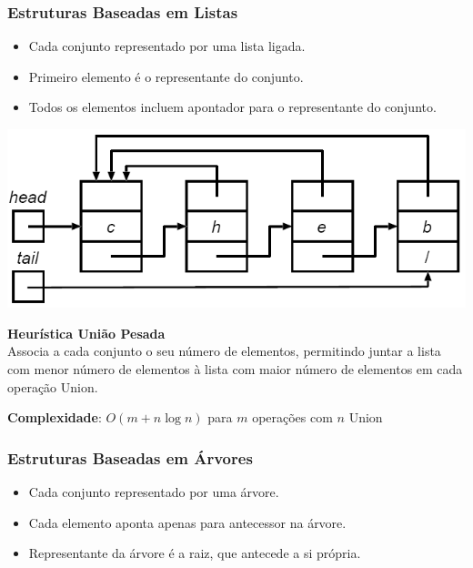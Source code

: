 \documentclass[11pt]{article}
\begin{document}
\subsubsection{Estruturas Baseadas em Listas}

\begin{minipage}{0.55\textwidth}
    \begin{itemize}[topsep=0pt]
        \item Cada conjunto representado por uma lista ligada.
        \item Primeiro elemento é o representante do conjunto.
        \item Todos os elementos incluem apontador para o representante do conjunto.
    \end{itemize}
\end{minipage}
\begin{minipage}{0.44\textwidth}
    \includegraphics[scale=0.4,right]{linked_list.png}
\end{minipage}

\textbf{Heurística União Pesada} \\[6pt]
Associa a cada conjunto o seu número de elementos, permitindo juntar a lista com menor número de elementos à lista com maior número de elementos em cada operação Union.

\textbf{Complexidade}: $O(m+n\log n)$ para $m$ operações com $n$ Union

\subsubsection{Estruturas Baseadas em Árvores}

\begin{itemize}
    \item Cada conjunto representado por uma árvore.
    \item Cada elemento aponta apenas para antecessor na árvore.
    \item Representante da árvore é a raiz, que antecede a si própria.
\end{itemize}
\end{document}
